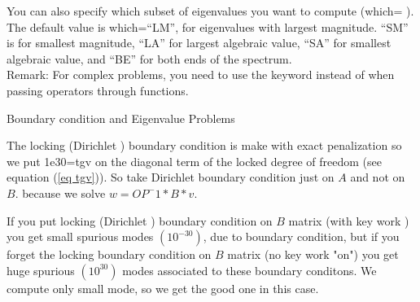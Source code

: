 \documentclass[a4paper,twoside,12pt]{book}
\begin{document}
You can also specify which subset of eigenvalues you want to compute (which= ). The default value is which=``LM'', for eigenvalues with largest magnitude. ``SM'' is for smallest magnitude, ``LA'' for largest algebraic value, ``SA'' for smallest algebraic value, and ``BE'' for both ends of the spectrum.\\

Remark: For complex problems, you need to use the keyword  instead of  when passing operators through functions.

\begin{note}{Boundary condition and Eigenvalue Problems\label{note BC EV}}\label{pp BC EV}

 The locking (Dirichlet ) boundary condition is make with exact penalization
 so   we put 1e30=tgv  on the diagonal term of the locked degree of freedom (see equation  (\ref{eq tgv})).
  So take Dirichlet boundary condition just on $A$
  and not on  $B$.
  because we solve $ w=OP^-1*B*v$.

  If you put  locking  (Dirichlet )  boundary condition on $B$ matrix  (with key work )
you get small spurious modes $(10^{-30})$, due to boundary condition, but if you forget the locking boundary condition on $B$ matrix  (no  key work "on")
you get huge spurious $(10^{30})$  modes associated to these boundary conditons.
We compute only small mode, so we get the good  one in this case.

\end{note}
\end{document}
